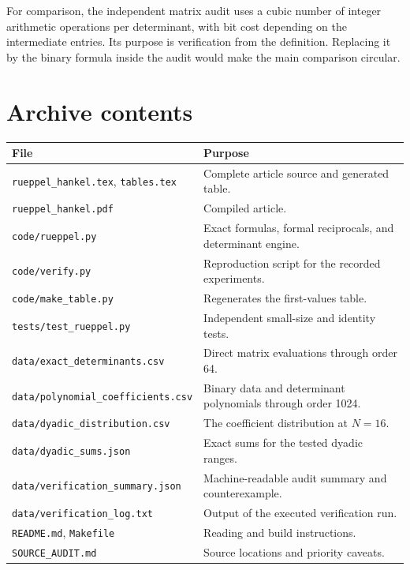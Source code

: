 \documentclass[11pt,a4paper]{article}
\numberwithin{equation}{section}
\theoremstyle{definition}
\theoremstyle{remark}
\begin{document}
For comparison, the independent matrix audit uses a cubic number of
integer arithmetic operations per determinant, with bit cost depending
on the intermediate entries. Its purpose is verification from the
definition. Replacing it by the binary formula inside the audit would
make the main comparison circular.

\section{Archive contents}

\begin{center}
\small
\begin{tabular}{@{}p{}p{}@{}}
\toprule
File & Purpose\\
\midrule
\texttt{rueppel\_hankel.tex}, \texttt{tables.tex} & Complete article source and generated table.\\
\texttt{rueppel\_hankel.pdf} & Compiled article.\\
\texttt{code/rueppel.py} & Exact formulas, formal reciprocals, and determinant engine.\\
\texttt{code/verify.py} & Reproduction script for the recorded experiments.\\
\texttt{code/make\_table.py} & Regenerates the first-values table.\\
\texttt{tests/test\_rueppel.py} & Independent small-size and identity tests.\\
\texttt{data/exact\_determinants.csv} & Direct matrix evaluations through order 64.\\
\texttt{data/polynomial\_coefficients.csv} & Binary data and determinant polynomials through order 1024.\\
\texttt{data/dyadic\_distribution.csv} & The coefficient distribution at $N=16$.\\
\texttt{data/dyadic\_sums.json} & Exact sums for the tested dyadic ranges.\\
\texttt{data/verification\_summary.json} & Machine-readable audit summary and counterexample.\\
\texttt{data/verification\_log.txt} & Output of the executed verification run.\\
\texttt{README.md}, \texttt{Makefile} & Reading and build instructions.\\
\texttt{SOURCE\_AUDIT.md} & Source locations and priority caveats.\\
\bottomrule
\end{tabular}
\end{center}
\end{document}
